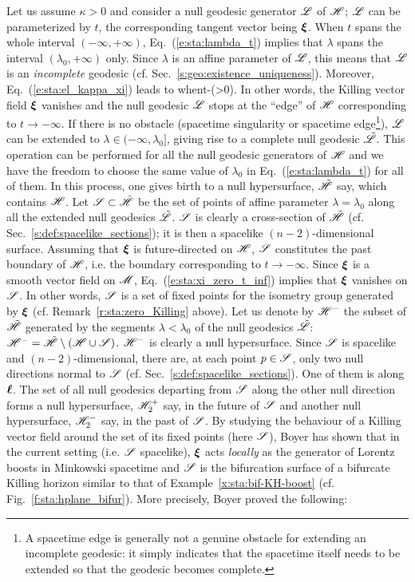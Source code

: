 Let us assume $\kappa>0$ and consider a
null geodesic generator $\mathscr{L}$ of $\mathscr{H}$; $\mathscr{L}$ can be parameterized by $t$, the corresponding
tangent vector being $\bm{\xi}$. When $t$ spans the whole interval $(-\infty,+\infty)$,
Eq.~(\ref{e:sta:lambda_t}) implies that $\lambda$ spans the
interval $(\lambda_0,+\infty)$ only. Since $\lambda$ is an affine parameter of $\mathscr{L}$,
this means that $\mathscr{L}$ is an \emph{incomplete} geodesic (cf. Sec.~\ref{s:geo:existence_uniqueness}).
Moreover, Eq.~(\ref{e:sta:el_kappa_xi}) leads to
\be \label{e:sta:xi_zero_t_inf}
    \w{\xi}  \quad\mbox{when}\quad t\rightarrow -\infty \qquad (\kappa>0).
\ee
In other words, the Killing vector field $\bm{\xi}$ vanishes and
the null geodesic $\mathscr{L}$ stops at the ``edge'' of $\mathscr{H}$ corresponding to
$t\rightarrow -\infty$.
If there is no obstacle (spacetime singularity or spacetime edge\footnote{A spacetime edge is generally not a genuine obstacle for extending an incomplete geodesic: it simply indicates
that the spacetime itself needs to be extended so that the geodesic becomes complete.}),
$\mathscr{L}$ can be
extended to $\lambda\in(-\infty,\lambda_0]$, giving rise to a complete
null geodesic $\tilde{\mathscr{L}}$. This operation can be performed for all the
null geodesic generators of $\mathscr{H}$ and we have the freedom to choose the same value
of $\lambda_0$ in Eq.~(\ref{e:sta:lambda_t}) for all of them. In this process,
one gives birth to a null hypersurface, $\tilde{\mathscr{H}}$ say, which contains $\mathscr{H}$. Let $\mathscr{S}\subset\tilde{\mathscr{H}}$ be the set of points of
affine parameter $\lambda=\lambda_0$ along all the extended null geodesics
$\tilde{\mathscr{L}}$. $\mathscr{S}$ is clearly a cross-section of $\tilde{\mathscr{H}}$
(cf. Sec.~\ref{s:def:spacelike_sections}); it is then a
spacelike $(n-2)$-dimensional surface.
Assuming that $\bm{\xi}$ is future-directed on $\mathscr{H}$,
$\mathscr{S}$ constitutes the past boundary of $\mathscr{H}$, i.e. the boundary corresponding to $t\rightarrow -\infty$.
Since $\bm{\xi}$ is a smooth vector field on $\mathscr{M}$, Eq.~(\ref{e:sta:xi_zero_t_inf})
implies that $\bm{\xi}$ vanishes on $\mathscr{S}$.
In other words, $\mathscr{S}$ is a set of fixed points for the isometry group generated
by $\bm{\xi}$ (cf. Remark~\ref{r:sta:zero_Killing} above).
Let us denote by $\mathscr{H}^-$ the subset of $\tilde{\mathscr{H}}$
generated by the segments $\lambda<\lambda_0$ of the null geodesics $\tilde{\mathscr{L}}$:
$\mathscr{H}^- = \tilde{\mathscr{H}}\setminus(\mathscr{H}\cup\mathscr{S})$.
$\mathscr{H}^-$ is clearly a null hypersurface.
Since $\mathscr{S}$ is spacelike and $(n-2)$-dimensional, there are, at each point
$p\in\mathscr{S}$, only two null directions normal to $\mathscr{S}$ (cf. Sec.~\ref{s:def:spacelike_sections}). One of them is along $\bm{\ell}$. The set of all null geodesics
departing from $\mathscr{S}$ along the other null direction forms a null hypersurface,
$\mathscr{H}_2^+$ say, in the future of $\mathscr{S}$ and another null hypersurface, $\mathscr{H}_2^-$
say, in the past of $\mathscr{S}$.
By studying the behaviour of a Killing vector field around the set of its
fixed points (here $\mathscr{S}$), Boyer \cite{Boyer69} has shown that in
the current setting (i.e. $\mathscr{S}$ spacelike), $\bm{\xi}$ acts \emph{locally}
as the generator of Lorentz boosts in Minkowski spacetime and $\mathscr{S}$ is the bifurcation surface
of a bifurcate Killing horizon similar to that of Example~\ref{x:sta:bif-KH-boost}
(cf. Fig.~\ref{f:sta:hplane_bifur}).
More precisely, Boyer proved the following:

